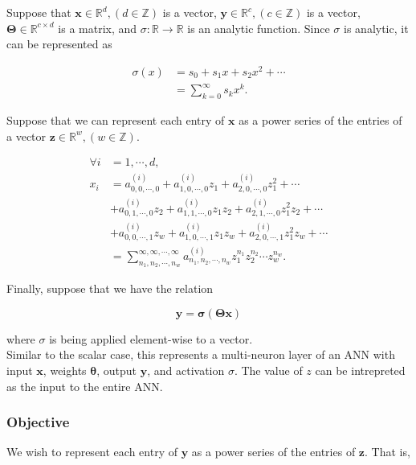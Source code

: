 Suppose that $\mathbf{x} \in \mathbb{R}^d, (d \in \mathbb{Z})$ is a vector, $\mathbf{y} \in \mathbb{R}^c, (c \in \mathbb{Z})$ is a vector, $\mathbf{\Theta} \in \mathbb{R}^{c \times d}$ is a matrix, and $\sigma: \mathbb{R} \to \mathbb{R}$ is an analytic function. Since $\sigma$ is analytic, it can be represented as

\begin{align}
    \sigma(x)
    &= s_0 + s_1 x + s_2 x^2 + \cdots \nonumber \\
    &= \sum_{k=0}^{\infty} s_{k} x^{k}.
    \label{eqn:vector layer activation}
\end{align}

Suppose that we can represent each entry of $\mathbf{x}$ as a power series of the entries of a vector $\mathbf{z} \in \mathbb{R}^{w}, (w \in \mathbb{Z})$.

\begin{align}
    \forall i &= 1, \cdots, d, \nonumber \\ x_i
    &= a^{(i)}_{0,0,\cdots,0} + a^{(i)}_{1,0,\cdots,0} z_1 + a^{(i)}_{2,0,\cdots,0} z_1^2 + \cdots \nonumber \\
    &+ a^{(i)}_{0,1,\cdots,0} z_2 + a^{(i)}_{1,1,\cdots,0} z_1 z_2 + a^{(i)}_{2,1,\cdots,0} z_1^2 z_2 + \cdots \nonumber \\
    &+ a^{(i)}_{0,0,\cdots,1} z_w + a^{(i)}_{1,0,\cdots,1} z_1 z_w + a^{(i)}_{2,0,\cdots,1} z_1^2 z_w + \cdots \nonumber \\
    &= \sum_{n_1,n_2,\cdots,n_w}^{\infty,\infty,\cdots,\infty} a^{(i)}_{n_1,n_2,\cdots,n_w} z_1^{n_1} z_2^{n_2} \cdots z_w^{n_w}.
    \label{eqn:vector x series}
\end{align}

Finally, suppose that we have the relation

\begin{equation}
    \mathbf{y} = \mathbf{\sigma}(\mathbf{\Theta} \mathbf{x})
    \label{eqn:vector layer relation}
\end{equation}

where $\sigma$ is being applied element-wise to a vector.\\

Similar to the scalar case, this represents a multi-neuron layer of an ANN with input $\mathbf{x}$, weights $\mathbf{\theta}$, output $\mathbf{y}$, and activation $\sigma$. The value of $z$ can be intrepreted as the input to the entire ANN.

\subsubsection{Objective}
We wish to represent each entry of $\mathbf{y}$ as a power series of the entries of $\mathbf{z}$. That is,

